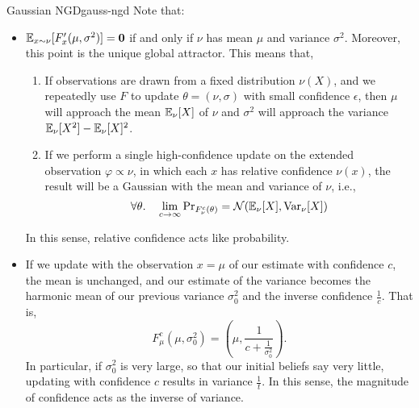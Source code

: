 \documentclass{article}
\begin{document}
\begin{examplex}{Gaussian NGD}{gauss-ngd}
    Note that:
    \begin{itemize}
        \item  $\operatorname*{\mathbb{E}}_{x \sim \nu} [ F'_x(\mu,\sigma^2) ] = \mathbf{0}$ if and only if $\nu$ has mean $\mu$ and variance $\sigma^2$.
        Moreover, this point is the unique global attractor.
        This means that, 
        \begin{enumerate}
            \item If observations are drawn from a fixed distribution $\nu(X)$, and we repeatedly use $F$ to update $\theta = (\nu, \sigma)$ with small confidence $\epsilon$,
            then $\mu$ will approach the mean $\operatorname*{\mathbb{E}}_{\nu}[X]$ of $\nu$
            and $\sigma^2$ will approach the variance $\operatorname*{\mathbb{E}}_{\nu}[X^2] - \operatorname*{\mathbb{E}}_{\nu}[X]^2$.             
            
            \item If we perform a single high-confidence update on the extended observation $\varphi \propto \nu$, in which each $x$ has relative confidence $\nu(x)$, the result will be a Gaussian with the mean and variance of $\nu$, i.e.,
            \[ 
                \forall \theta.\quad
                \lim_{c \to \infty} \Pr\nolimits_{F_{\nu}^c(\theta)} = \mathcal N(\operatorname*{\mathbb{E}}\nolimits_{\nu}[X], {\mathrm{Var}}_{\nu}[X])
            \]
        \end{enumerate}
        In this sense, relative confidence acts like probability.
        
        \item 
        If we update with the observation $x = \mu$ of our estimate with confidence $c$,
        the mean is unchanged, and our estimate of the variance becomes the harmonic mean of our previous variance $\sigma_0^2$ and the inverse confidence $\frac1c$.
        That is, 
        \[
            F^c_\mu(\mu, \sigma_0^2) = 
            \left(\mu, \frac{1}{c + \frac{1}{\sigma_0^2}} \right).
        \]
        In particular, if $\sigma_0^2$ is very large, so that our initial beliefs say very little, updating with confidence $c$ results in variance $\frac1t$.
        In this sense, the magnitude of confidence acts as the inverse of variance.
    \end{itemize}
\end{examplex}
\end{document}
